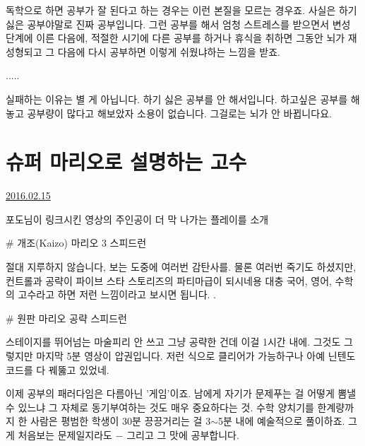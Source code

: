 독학으로 하면 공부가 잘 된다고 하는 경우는 이런 본질을 모르는 경우죠.
사실은 하기싫은 공부야말로 진짜 공부입니다. 그런 공부를 해서 엄청 스트레스를 받으면서 변성 단계에 이른 다음에,
적절한 시기에 다른 공부를 하거나 휴식을 취하면 그동안 뇌가 재성형되고 그 다음에 다시 공부하면 이렇게 쉬웠냐하는 느낌을 받죠.
\vspace{5mm}

.....
\vspace{5mm}

실패하는 이유는 별 게 아닙니다. 하기 싫은 공부를 안 해서입니다.
하고싶은 공부를 해놓고 공부량이 많다고 해보았자 소용이 없습니다. 그걸로는 뇌가 안 바뀝니다요.
\vspace{5mm}








\section{슈퍼 마리오로 설명하는 고수}
\href{https://www.kockoc.com/Apoc/636264}{2016.02.15}

\vspace{5mm}

포도님이 링크시킨 영상의 주인공이 더 막 나가는 플레이를 소개
\vspace{5mm}

$\#$ 개조(Kaizo) 마리오 3 스피드런
\vspace{5mm}

절대 지루하지 않습니다, 보는 도중에 여러번 감탄사를.
물론 여러번 죽기도 하셨지만, 컨트롤과 공략이 파이브 스타 스토리즈의 파티마급이 되시네용
대충 국어, 영어, 수학의 고수라고 하면 저런 느낌이라고 보시면 됩니다. .
\vspace{5mm}

$\#$ 원판 마리오 공략 스피드런
\vspace{5mm}

스테이지를 뛰어넘는 마술피리 안 쓰고 그냥 공략한 건데 이걸 1시간 내에.
그것도 그렇지만 마지막 5분 영상이 압권입니다. 저런 식으로 클리어가 가능하구나
아예 닌텐도 코드를 다 꿰뚫고 있었네.
\vspace{5mm}

이제 공부의 패러다임은 다름아닌 '게임'이죠.
남에게 자기가 문제푸는 걸 어떻게 뽐낼 수 있느냐 그 자체로 동기부여하는 것도 매우 중요하다는 것.
수학 양치기를 한계량까지 한 사람은
평범한 학생이 30분 끙끙거리는 걸 3$\sim$5분 내에 예술적으로 풀이하죠.
그게 처음보는 문제일지라도 $-$ 그리고 그 맛에 공부합니다.
\vspace{5mm}






